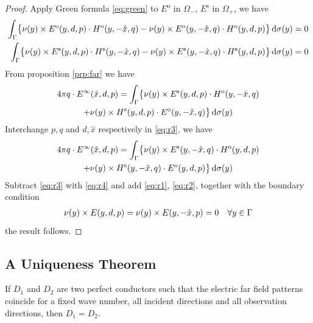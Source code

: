 \begin{proof}
  Apply Green formula \eqref{eq:green} to $E^\text{o}$ in $\Omega_-$, $E^\text{s}$ in $\Omega_+$, we have
  \begin{align}
    \int_{\Gamma}\bigl\{\nu(y)\times E^\text{o}(y, d, p)\cdot H^\text{o}(y, -\hat{x}, q) - \nu(y)\times E^\text{o}(y, -\hat{x}, q)\cdot H^\text{o}(y, d, p)\bigr\}\,\text{d}\sigma(y) = 0 \label{eq:r1} \\ 
    \int_{\Gamma}\bigl\{\nu(y)\times E^\text{s}(y, d, p)\cdot H^\text{s}(y, -\hat{x}, q) - \nu(y)\times E^\text{s}(y, -\hat{x}, q)\cdot H^\text{s}(y, d, p)\bigr\}\,\text{d}\sigma(y) = 0 \label{eq:r2}
  \end{align}
  From proposition \eqref{prp:far} we have
  \begin{multline}\label{eq:r3}
    4\pi q\cdot E^\infty(\hat{x}, d, p) = \int_{\Gamma}\bigl\{\nu(y)\times E^\text{s}(y, d, p)\cdot H^\text{o}(y, -\hat{x}, q)\bigr. \\+ \bigl.\nu(y)\times H^\text{s}(y, d, p)\cdot E^\text{o}(y, -\hat{x}, q)\bigr\}\,\text{d}\sigma(y) 
  \end{multline}
  Interchange $p, q$ and $d, \hat{x}$ respectively in \eqref{eq:r3}, we have 
  \begin{multline}\label{eq:r4}
    4\pi q\cdot E^\infty(\hat{x}, d, p) = \int_{\Gamma}\bigl\{\nu(y)\times E^\text{s}(y, -\hat{x}, q)\cdot H^\text{o}(y, d, p)\bigr. \\+ \bigl.\nu(y)\times H^\text{s}(y, -\hat{x}, q)\cdot E^\text{o}(y, d, p)\bigr\}\,\text{d}\sigma(y) 
  \end{multline}
  Subtract \eqref{eq:r3} with \eqref{eq:r4} and add \eqref{eq:r1}, \eqref{eq:r2}, together with the boundary condition 
  \begin{align*}
    \nu(y)\times E(y, d, p)=\nu(y)\times E(y, -\hat{x}, p)=0\quad\forall y\in\Gamma
  \end{align*}
  the result follows. 
\end{proof}


\subsection{A Uniqueness Theorem}
\begin{thm}
  If $D_1$ and $D_2$ are two perfect conductors such that the electric far field patterns coincide for a fixed wave number, all incident directions and all observation directions, then $D_1=D_2$.
\end{thm}

